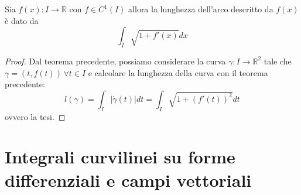 \begin{cor}
	Sia $f(x): I \to \mathbb{R}$ con $f \in C^1(I)$ allora la lunghezza dell'arco descritto da $f(x)$ è dato da
	$$
		\int_I \sqrt{1 + f'(x)}dx
	$$
\end{cor}
\begin{proof}
Dal teorema precedente, possiamo considerare la curva $\gamma: I \to \mathbb{R}^2$ tale che $\gamma = (t, f(t)) \, \forall t \in I$ e calcolare la lunghezza della curva con il teorema precedente:
$$
	\mathit{l}(\gamma) = \int_{I} |\dot{\gamma}(t)|dt = \int_I \sqrt{1 + (f'(t))^2} dt
$$
ovvero la tesi.
\end{proof}
\section{Integrali curvilinei su forme differenziali e campi vettoriali}

